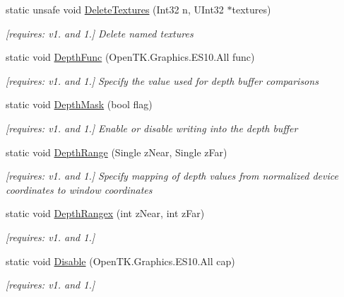 \begin{DoxyCompactItemize}
static unsafe void \hyperlink{class_open_t_k_1_1_graphics_1_1_e_s10_1_1_g_l_a7172582798966ade408151b2d41f059e}{Delete\-Textures} (Int32 n, U\-Int32 $\ast$textures)
\begin{DoxyCompactList}\small\item\em \mbox{[}requires\-: v1. and 1.\mbox{]} Delete named textures \end{DoxyCompactList}\item 
static void \hyperlink{class_open_t_k_1_1_graphics_1_1_e_s10_1_1_g_l_a5fa26c4dab4688e7ba04188456d24dfc}{Depth\-Func} (Open\-T\-K.\-Graphics.\-E\-S10.\-All func)
\begin{DoxyCompactList}\small\item\em \mbox{[}requires\-: v1. and 1.\mbox{]} Specify the value used for depth buffer comparisons \end{DoxyCompactList}\item 
static void \hyperlink{class_open_t_k_1_1_graphics_1_1_e_s10_1_1_g_l_a3c23130545670e7aca25ad82e2eac0b3}{Depth\-Mask} (bool flag)
\begin{DoxyCompactList}\small\item\em \mbox{[}requires\-: v1. and 1.\mbox{]} Enable or disable writing into the depth buffer \end{DoxyCompactList}\item 
static void \hyperlink{class_open_t_k_1_1_graphics_1_1_e_s10_1_1_g_l_a1a2bd55d4fefcffdfb26551c9edc807f}{Depth\-Range} (Single z\-Near, Single z\-Far)
\begin{DoxyCompactList}\small\item\em \mbox{[}requires\-: v1. and 1.\mbox{]} Specify mapping of depth values from normalized device coordinates to window coordinates \end{DoxyCompactList}\item 
static void \hyperlink{class_open_t_k_1_1_graphics_1_1_e_s10_1_1_g_l_a3b4e3a115259fc7bae858589d8727e4e}{Depth\-Rangex} (int z\-Near, int z\-Far)
\begin{DoxyCompactList}\small\item\em \mbox{[}requires\-: v1. and 1.\mbox{]}\end{DoxyCompactList}\item 
static void \hyperlink{class_open_t_k_1_1_graphics_1_1_e_s10_1_1_g_l_a73fb4d4b6e535f6336efe1495a94ffb5}{Disable} (Open\-T\-K.\-Graphics.\-E\-S10.\-All cap)
\begin{DoxyCompactList}\small\item\em \mbox{[}requires\-: v1. and 1.\mbox{]}\end{DoxyCompactList}\item 

\end{DoxyCompactItemize}
